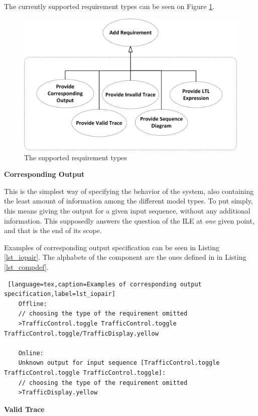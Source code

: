 The currently supported requirement types can be seen on Figure \ref{fig_requirementtypes}.

\begin{figure}[!ht] 
	\centering
		\includegraphics[width=130mm, keepaspectratio]{figures/methodology_requirementtypes.png}
	\caption{The supported requirement types}
	\label{fig_requirementtypes}
\end{figure}

\textbf{Corresponding Output}

This is the simplest way of specifying the behavior of the system, also containing the least amount of information among the different model types. To put simply, this means giving the output for a given input sequence, without any additional information. This supposedly answers the question of the ILE at \textit{one} given point, and that is the end of its scope.

Examples of corresponding output specification can be seen in Listing \ref{lst_iopair}. The alphabets of the component are the ones defined in in Listing \ref{lst_compdef}.

\bigskip
\begin{lstlisting} [language=tex,caption=Examples of corresponding output specification,label=lst_iopair]
	Offline: 
	// choosing the type of the requirement omitted
	>TrafficControl.toggle TrafficControl.toggle TrafficControl.toggle/TrafficDisplay.yellow
	
	Online: 
	Unknown output for input sequence [TrafficControl.toggle TrafficControl.toggle TrafficControl.toggle]:
	// choosing the type of the requirement omitted
	>TrafficDisplay.yellow
\end{lstlisting}

\textbf{Valid Trace}

